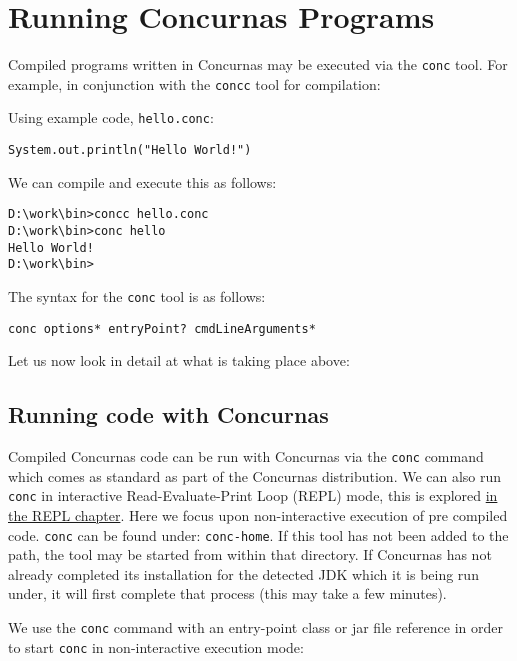 \documentclass[conc-doc]{subfiles}
\begin{document}
	\chapter[Running Concurnas Programs]{Running Concurnas Programs}
	\label{ch:conc}

Compiled programs written in Concurnas may be executed via the \lstinline[language=None]{conc} tool. For example, in conjunction with the \lstinline[language=None]{concc} tool for compilation:


Using example code, \lstinline[language=None]{hello.conc}:
\begin{lstlisting}
System.out.println("Hello World!")
\end{lstlisting}

We can compile and execute this as follows:
\begin{lstlisting}[language=None]
D:\work\bin>concc hello.conc
D:\work\bin>conc hello
Hello World!
D:\work\bin>
\end{lstlisting}

The syntax for the \lstinline[language=None]{conc} tool is as follows:

\begin{center}
	\lstinline[language=None]{conc options* entryPoint? cmdLineArguments*}
\end{center}

Let us now look in detail at what is taking place above:

\section{Running code with Concurnas}
Compiled Concurnas code can be run with Concurnas via the \lstinline[language=None]{conc} command which comes as standard as part of the Concurnas distribution. We can also run \lstinline[language=None]{conc} in interactive Read-Evaluate-Print Loop (REPL) mode, this is explored \hyperref[ch:repl]{in the REPL chapter}. Here we focus upon non-interactive execution of pre compiled code. \lstinline[language=None]{conc} can be found under: \lstinline[language=None]{conc-home}. If this tool has not been added to the path, the tool may be started from within that directory. If Concurnas has not already completed its installation for the detected JDK which it is being run under, it will first complete that process (this may take a few minutes).

We use the \lstinline[language=None]{conc} command with an entry-point class or jar file reference in order to start \lstinline[language=None]{conc} in non-interactive execution mode:
\end{document}
